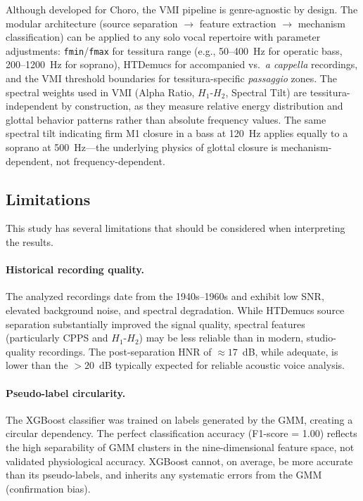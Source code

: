 \documentclass[review,3p,number]{elsarticle}
\begin{document}
Although developed for Choro, the VMI pipeline is genre-agnostic by design. The
modular architecture (source separation $\rightarrow$ feature extraction
$\rightarrow$ mechanism classification) can be applied to any solo vocal repertoire
with parameter adjustments: \texttt{fmin}/\texttt{fmax} for tessitura range (e.g.,
50--400~Hz for operatic bass, 200--1200~Hz for soprano), HTDemucs for accompanied
vs.\ \emph{a cappella} recordings, and the VMI threshold boundaries for
tessitura-specific \emph{passaggio} zones.\cite{bozeman2013,sundberg1987}
The spectral weights used in VMI (Alpha Ratio, $H_1$-$H_2$, Spectral Tilt) are
tessitura-independent by construction, as they measure relative energy distribution
and glottal behavior patterns rather than absolute frequency values. The same
spectral tilt indicating firm M1 closure in a bass at 120~Hz applies equally to a
soprano at 500~Hz---the underlying physics of glottal closure is mechanism-dependent,
not frequency-dependent.\cite{degottex2011,drugman2019}

\subsection{Limitations}
\label{sec:limitations}

This study has several limitations that should be considered when interpreting the
results.

\paragraph{Historical recording quality.}
The analyzed recordings date from the 1940s--1960s and exhibit low SNR, elevated
background noise, and spectral degradation. While HTDemucs source separation
substantially improved the signal quality, spectral features (particularly CPPS and
$H_1$-$H_2$) may be less reliable than in modern, studio-quality recordings. The
post-separation HNR of $\approx 17$~dB, while adequate, is lower than the
$> 20$~dB typically expected for reliable acoustic voice analysis.

\paragraph{Pseudo-label circularity.}
The XGBoost classifier was trained on labels generated by the GMM, creating a
circular dependency. The perfect classification accuracy (F1-score = 1.00) reflects the
high separability of GMM clusters in the nine-dimensional feature space, not
validated physiological accuracy. XGBoost cannot, on average, be more accurate than
its pseudo-labels, and inherits any systematic errors from the GMM (confirmation
bias).\cite{lee2013}
\end{document}
